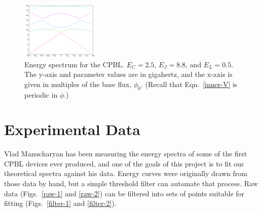 \documentclass[twocolumn]{revtex4}
\newcommand{\figwidth}{0.33\textwidth}
\begin{document}
\begin{figure} 
\includegraphics[width=\figwidth]{CPBL-theory.png}
\caption{ Energy spectrum for the CPBL. $E_C=2.5$, $E_J=8.8$, and
  $E_L=0.5$. The y-axis and parameter values are in gigahertz, and the
  x-axis is given in multiples of the base flux, $\phi_0$. (Recall
  that Eqn.~\ref{inner-V} is periodic in $\phi$.)}
\label{cpbl-theory}
\end{figure}

\section{Experimental Data}
Vlad Manucharyan has been measuring the energy spectra of some of the
first CPBL devices ever produced, and one of the goals of this project
is to fit our theoretical spectra against his data. Energy curves were
originally drawn from those data by hand, but a simple threshold
filter can automate that process. Raw data (Figs.~\ref{raw-1} and
\ref{raw-2}) can be filtered into sets of points suitable for fitting
(Figs.~\ref{filter-1} and \ref{filter-2}).
\end{document}
